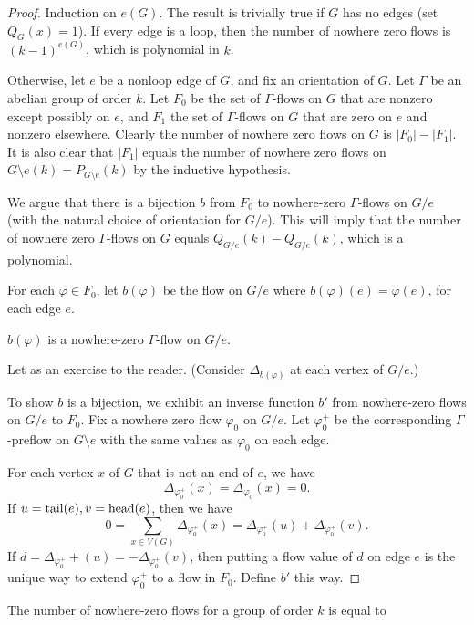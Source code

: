 \documentclass[main.tex]{subfiles}
\begin{document}
\begin{proof}
  Induction on $e(G)$.
  The result is trivially true if $G$ has no edges (set $Q_G(x) = 1$).
  If every edge is a loop, then the number of nowhere zero flows is
  $(k-1)^{e(G)}$, which is polynomial in $k$.

  Otherwise, let $e$ be a nonloop edge of $G$, and fix an orientation of $G$.
  Let $\Gamma$ be an abelian group of order $k$.
  Let $F_0$ be the set of $\Gamma$-flows on $G$ that are nonzero except possibly on $e$,
  and $F_1$ the set of $\Gamma$-flows on $G$ that are zero on $e$ and nonzero
  elsewhere.
  Clearly the number of nowhere zero flows on $G$ is $|F_0| - |F_1|$.
  It is also clear that $|F_1|$ equals the number of nowhere zero flows on
  $G\setminus e(k) = P_{G\setminus e}(k)$ by the inductive hypothesis.

  We argue that there is a bijection $b$ from $F_0$ to nowhere-zero
  $\Gamma$-flows on $G/e$ (with the natural choice of orientation for $G/e$).
  This will imply that the number of nowhere zero $\Gamma$-flows on $G$ equals
  $Q_{G/e}(k) - Q_{G/e}(k)$, which is a polynomial.

  For each $\varphi\in F_0$, let $b(\varphi)$ be the flow on $G/e$ where
  $b(\varphi)(e) = \varphi(e)$, for each edge $e$.
  \begin{claim}
    $b(\varphi)$ is a nowhere-zero $\Gamma$-flow on $G/e$.
  \end{claim}
  \begin{subproof}
    Let as an exercise to the reader.
    (Consider $\Delta_{b(\varphi)}$ at each vertex of $G/e$.)
  \end{subproof}
  To show $b$ is a bijection, we exhibit an inverse function $b'$ from
  nowhere-zero flows on $G/e$ to $F_0$.
  Fix a nowhere zero flow $\varphi_0$ on $G/e$.
  Let $\varphi_0^+$ be the corresponding $\Gamma$-preflow on $G\setminus e$
  with the same values as $\varphi_0$ on each edge.

  For each vertex $x$ of $G$ that is not an end of $e$, we have
  \[
    \Delta_{\varphi_0^+}(x) = \Delta_{\varphi_0}(x) = 0.
  \]
  If $u = \operatorname{tail}(e), v = \operatorname{head}(e)$, then we have
  \[
    0 = \sum_{x\in V(G)}\Delta_{\varphi_0^+}(x)
    = \Delta_{\varphi_0^+}(u) + \Delta_{\varphi_0^+}(v).
  \]
  If $d = \Delta_{\varphi_0^+}+(u) = -\Delta_{\varphi_0^+}(v)$, then putting a
  flow value of $d$ on edge $e$ is the unique way to extend $\varphi_0^+$ to a
  flow in $F_0$.
  Define $b'$ this way.
\end{proof}
The number of nowhere-zero flows for a group of order $k$ is equal to
\end{document}
